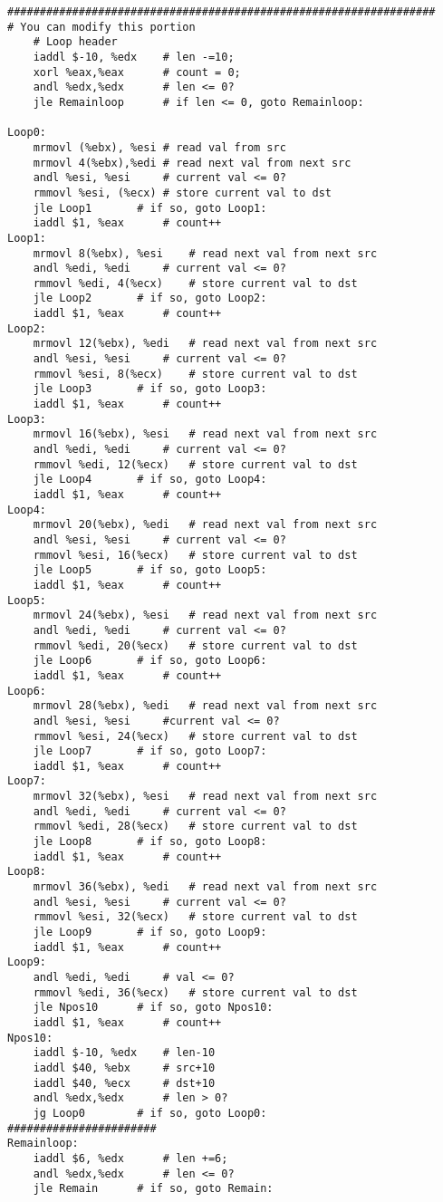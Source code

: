 \documentclass{article}
\begin{document}
\begin{lstlisting}[language={[x86masm]Assembler}]
##################################################################
# You can modify this portion
	# Loop header
	iaddl $-10, %edx	# len -=10;
	xorl %eax,%eax		# count = 0;
	andl %edx,%edx		# len <= 0?
	jle Remainloop		# if len <= 0, goto Remainloop:

Loop0:	
	mrmovl (%ebx), %esi	# read val from src
	mrmovl 4(%ebx),%edi	# read next val from next src
	andl %esi, %esi		# current val <= 0?
	rmmovl %esi, (%ecx)	# store current val to dst
	jle Loop1		# if so, goto Loop1:
	iaddl $1, %eax		# count++
Loop1:	
	mrmovl 8(%ebx), %esi	# read next val from next src
	andl %edi, %edi		# current val <= 0?
	rmmovl %edi, 4(%ecx)	# store current val to dst
	jle Loop2		# if so, goto Loop2:
	iaddl $1, %eax		# count++
Loop2:	
	mrmovl 12(%ebx), %edi	# read next val from next src
	andl %esi, %esi		# current val <= 0?
	rmmovl %esi, 8(%ecx)	# store current val to dst
	jle Loop3		# if so, goto Loop3:
	iaddl $1, %eax		# count++
Loop3:	
	mrmovl 16(%ebx), %esi	# read next val from next src
	andl %edi, %edi		# current val <= 0?
	rmmovl %edi, 12(%ecx)	# store current val to dst
	jle Loop4		# if so, goto Loop4:
	iaddl $1, %eax		# count++
Loop4:	
	mrmovl 20(%ebx), %edi	# read next val from next src
	andl %esi, %esi		# current val <= 0?
	rmmovl %esi, 16(%ecx)	# store current val to dst
	jle Loop5		# if so, goto Loop5:
	iaddl $1, %eax		# count++
Loop5:	
	mrmovl 24(%ebx), %esi	# read next val from next src
	andl %edi, %edi		# current val <= 0?
	rmmovl %edi, 20(%ecx)	# store current val to dst
	jle Loop6		# if so, goto Loop6:
	iaddl $1, %eax		# count++
Loop6:	
	mrmovl 28(%ebx), %edi	# read next val from next src
	andl %esi, %esi		#current val <= 0?
	rmmovl %esi, 24(%ecx)	# store current val to dst
	jle Loop7		# if so, goto Loop7:
	iaddl $1, %eax		# count++
Loop7:	
	mrmovl 32(%ebx), %esi	# read next val from next src
	andl %edi, %edi		# current val <= 0?
	rmmovl %edi, 28(%ecx)	# store current val to dst
	jle Loop8		# if so, goto Loop8:
	iaddl $1, %eax		# count++
Loop8:	
	mrmovl 36(%ebx), %edi	# read next val from next src
	andl %esi, %esi		# current val <= 0?
	rmmovl %esi, 32(%ecx)	# store current val to dst
	jle Loop9		# if so, goto Loop9:
	iaddl $1, %eax		# count++
Loop9:	
	andl %edi, %edi		# val <= 0?
	rmmovl %edi, 36(%ecx)	# store current val to dst
	jle Npos10		# if so, goto Npos10:
	iaddl $1, %eax		# count++
Npos10:	
	iaddl $-10, %edx	# len-10
	iaddl $40, %ebx		# src+10
	iaddl $40, %ecx		# dst+10
	andl %edx,%edx		# len > 0?
	jg Loop0		# if so, goto Loop0:
#######################
Remainloop:
	iaddl $6, %edx		# len +=6;
	andl %edx,%edx		# len <= 0?
	jle Remain		# if so, goto Remain:


\end{lstlisting}
\end{document}
